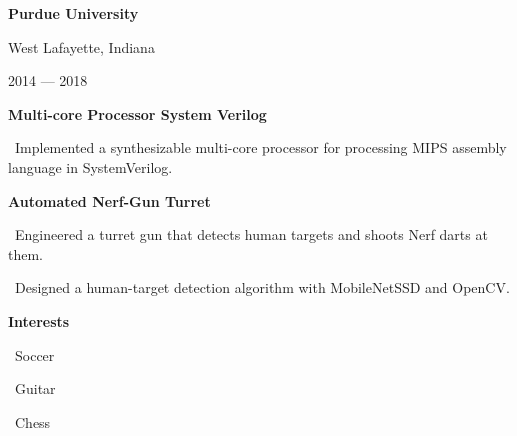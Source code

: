 \documentclass{article}
\begin{document}
\begin{minipage}[t]{3.1in\linewidth\hspace{0.83in}}
    \bfseries{Purdue University} 

    \small\mdseries\textrm West Lafayette, Indiana

    \small\mdseries\textrm 2014 — 2018

    \vspace{0.4em}

    \small\bfseries\textrm{Multi-core Processor System Verilog}
    
    \vspace{0.3em}
    \small\mdseries
    \hspace{0em}\textasteriskcentered \, \mdseries\textrm{Implemented a synthesizable multi-core processor for processing MIPS assembly language in SystemVerilog.}
    \vspace{0.4em}
    
    \small\bfseries\textrm{Automated Nerf-Gun Turret}
    
    \vspace{0.5em}
    \small\mdseries
    \hspace{0em}\textasteriskcentered \, \mdseries\textrm{Engineered a turret gun that detects human targets and shoots Nerf darts at them.}

    \vspace{0.5em}
    \hspace{0em}\textasteriskcentered \, \mdseries\textrm{Designed a human-target detection algorithm with MobileNetSSD and OpenCV.}

    \vspace{6.7em}
    \begin{minipage}[t]{3.75in\textwidth\hspace{0in}}
        \large\mdseries\bfseries{Interests}            
        
        \small\mdseries
        \vspace{0.3em}
        \hspace{0.3em}\textasteriskcentered \, \small\mdseries\textrm{Soccer}

        \vspace{0.3em}
        \hspace{0.3em}\textasteriskcentered \, \small\mdseries\textrm{Guitar}        
        
        \vspace{0.3em}
        \hspace{0.3em}\textasteriskcentered \, \small\mdseries\textrm{Chess}

    \end{minipage}

\end{minipage}
\end{document}
